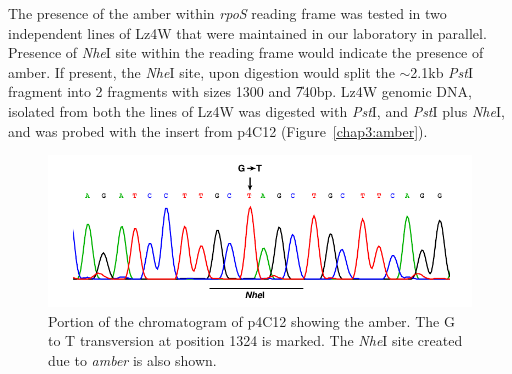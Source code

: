 The presence of the amber within \emph{rpoS} reading frame was
tested in two independent lines of Lz4W that were maintained in
our laboratory in parallel. Presence of \emph{Nhe}I site within
the reading frame would indicate the presence of amber. If
present, the \emph{Nhe}I site, upon digestion would split the
\U{$\sim$2.1}{kb} \emph{Pst}I fragment into 2 fragments with sizes
1300 and \U{740}{bp}. Lz4W genomic DNA, isolated from both the
lines of Lz4W was digested with \emph{Pst}I, and \emph{Pst}I plus
\emph{Nhe}I, and was probed with the insert from p4C12
(Figure~\ref{chap3:amber}).

\begin{figure}[tbp]
\includegraphics{figures/chap3_chromatogram.pdf}
\caption[Chromatogram of \emph{rpoS} showing the
\emph{amber}]{Portion of the chromatogram of p4C12 showing the
amber. The G to T transversion at position 1324 is marked. The
\emph{Nhe}I site created due to \emph{amber} is also shown.}
\label{chromatogram}
\end{figure}

